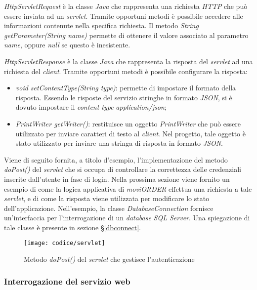\textit{HttpServletRequest} è la classe \textit{Java} che rappresenta una richiesta \textit{HTTP} che può essere inviata ad un \textit{servlet}. Tramite opportuni metodi è possibile accedere alle informazioni contenute nella specifica richiesta. Il metodo \textit{String getParameter(String name)} permette di ottenere il valore associato al parametro \textit{name}, oppure \textit{null} se questo è inesistente.

\textit{HttpServletResponse} è la classe \textit{Java} che rappresenta la risposta del \textit{servlet} ad una richiesta del \textit{client}. Tramite opportuni metodi è possibile configurare la risposta:
\begin{itemize}
	\item \textit{void setContentType(String type)}: permette di impostare il formato della risposta. Essendo le risposte del servizio stringhe in formato \textit{JSON}, si è dovuto impostare il \textit{content type} \textit{application/json};
	\item \textit{PrintWriter getWriter()}: restituisce un oggetto \textit{PrintWriter} che può essere utilizzato per inviare caratteri di testo al \textit{client}. Nel progetto, tale oggetto è stato utilizzato per inviare una stringa di risposta in formato \textit{JSON}.
\end{itemize}

Viene di seguito fornita, a titolo d'esempio, l'implementazione del metodo \textit{doPost()} del \textit{servlet} che si occupa di controllare la correttezza delle credenziali inserite dall'utente in fase di login. Nella prossima sezione viene fornito un esempio di come la logica applicativa di \textit{moviORDER} effettua una richiesta a tale \textit{servlet}, e di come la risposta viene utilizzata per modificare lo stato dell'applicazione. Nell'esempio, la classe \textit{DatabaseConnection} fornisce un'interfaccia per l'interrogazione di un \textit{database} \textit{SQL Server}. Una spiegazione di tale classe è presente in sezione §\ref{dbconnect}.

\begin{figure}[!h] 
    \centering 
    \texttt{[image: codice/servlet]} 
    \caption{Metodo \textit{doPost()} del \textit{servlet} che gestisce l'autenticazione}
\end{figure}

\subsubsection{Interrogazione del servizio web}


